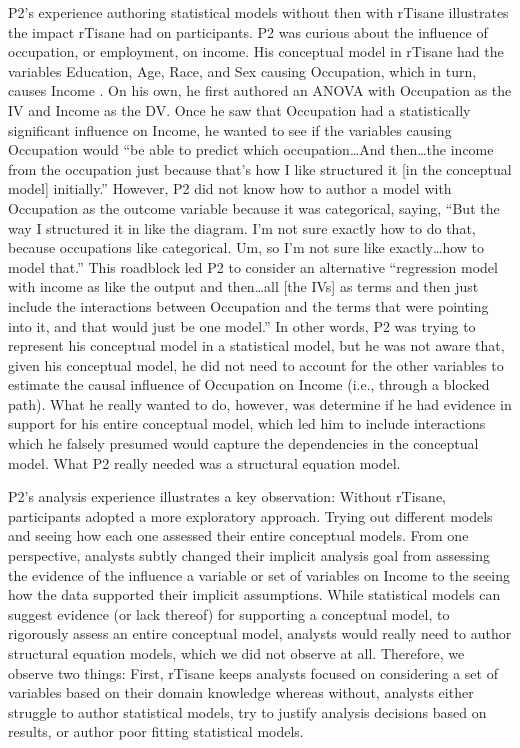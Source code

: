 P2’s experience authoring statistical models without then with rTisane
illustrates the impact rTisane had on participants. P2 was curious about the
influence of occupation, or employment, on income. His conceptual model in
rTisane had the variables Education, Age, Race, and Sex causing Occupation,
which in turn, causes Income . On his own, he first authored an
ANOVA with Occupation as the IV and Income as the DV. Once he saw that
Occupation had a statistically significant influence on Income, he wanted to see
if the variables causing Occupation would “be able to predict which
occupation…And then…the income from the occupation just because that’s how I
like structured it [in the conceptual model] initially.” However, P2 did not
know how to author a model with Occupation as the outcome variable because it
was categorical, saying, “But the way I structured it in like the diagram. I'm
not sure exactly how to do that, because occupations like categorical. Um, so
I'm not sure like exactly…how to model that.” This roadblock led P2 to consider
an alternative ``regression model with income as like the output and then…all
[the IVs] as terms and then just include the interactions between Occupation and
the terms that were pointing into it, and that would just be one model.'' In
other words, P2 was trying to represent his conceptual model in a statistical
model, but he was not aware that, given his conceptual model, he did not need to
account for the other variables to estimate the causal influence of Occupation
on Income (i.e., through a blocked path). What he really wanted to do, however,
was determine if he had evidence in support for his entire conceptual model,
which led him to include interactions which he falsely presumed would capture
the dependencies in the conceptual model. What P2 really needed was a structural
equation model. 

P2’s analysis experience illustrates a key observation: Without rTisane,
participants adopted a more exploratory approach. Trying out different models
and seeing how each one assessed their entire conceptual models. From one
perspective, analysts subtly changed their implicit analysis goal from assessing
the evidence of the influence a variable or set of variables on Income to the
seeing how the data supported their implicit assumptions. While statistical
models can suggest evidence (or lack thereof) for supporting a conceptual model,
to rigorously assess an entire conceptual model, analysts would really need to
author structural equation models, which we did not observe at all. Therefore,
we observe two things: First, rTisane keeps analysts focused on considering a
set of variables based on their domain knowledge whereas without, analysts
either struggle to author statistical models, try to justify analysis decisions
based on results, or author poor fitting statistical models. 

